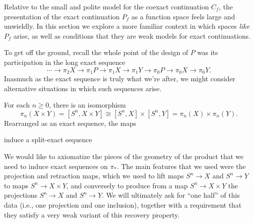 Relative to the small and polite model for the coexact continuation $C_f$, the presentation of the exact continuation $P_f$ as a function space feels large and unwieldly.%
In this section we explore a more familiar context in which spaces \emph{like} $P_f$ arise, as well as conditions that they are weak models for exact continuations.

To get off the ground, recall the whole point of the design of $P$ was its participation in the long exact sequence%
\[\cdots \to \pi_2 X \to \pi_1 P \to \pi_1 X \to \pi_1 Y \to \pi_0 P \to \pi_0 X \to \pi_0 Y.\]
Inasmuch as the exact sequence is truly what we're after, we might consider alternative situations in which such sequences arise.

\begin{example}
For each $n \ge 0$, there is an isomorphism \[\pi_n(X \times Y) = [S^n, X \times Y] \cong [S^n, X] \times [S^n, Y] = \pi_n(X) \times \pi_n(Y).\]
Rearranged as an exact sequence, the maps
\begin{center}
\end{center}
induce a split-exact sequence
\begin{center}
\end{center}
\end{example}

\noindent
We would like to axiomatize the pieces of the geometry of the product that we need to induce exact sequences on $\pi_*$.
The main features that we used were the projection and retraction maps, which we used to lift maps $S^n \to X$ and $S^n \to Y$ to maps $S^n \to X \times Y$, and conversely to produce from a map $S^n \to X \times Y$ the projections $S^n \to X$ and $S^n \to Y$.
We will ultimately ask for ``one half'' of this data (i.e., one projection and one inclusion), together with a requirement that they satisfy a very weak variant of this recovery property.

